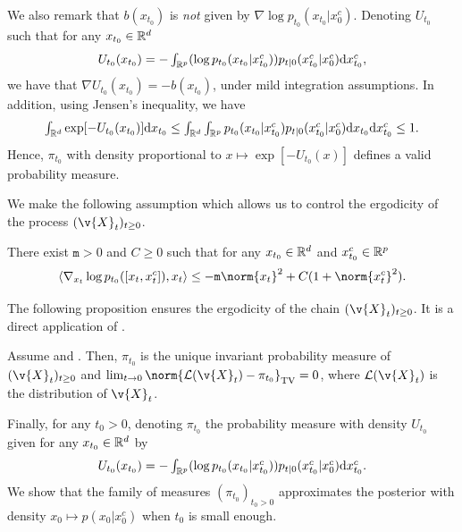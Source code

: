 We also remark that $b(x_{t_0})$ is \emph{not} given by $\nabla \log p_{t_0}(x_{t_0}|x_0^c)$.
Denoting $U_{t_0}$ such that for any $x_{t_0} \in \mathbb{R}^d$ \begin{equation} \textstyle U_{t_0}(x_{t_0}) = -\int_{\mathbb{R}^p} (\log p_{t_0}(x_{t_0} | x_{t_0}^c)) p_{t|0}(x_{t_0}^c|x_0^c) \mathrm{d} x_{t_0}^c , \end{equation} we have that $\nabla U_{t_0}(x_{t_0}) = -b(x_{t_0})$, under mild integration assumptions.
In addition, using Jensen's inequality, we have \begin{align} \textstyle \int_{\mathbb{R}^d} \exp[-U_{t_0}(x_{t_0})] \mathrm{d} x_{t_0} \leq \int_{\mathbb{R}^d} \int_{\mathbb{R}^p} p_{t_0}(x_{t_0}| x_{t_0}^c) p_{t|0}(x_{t_0}^c|x_0^c) \mathrm{d} x_{t_0} \mathrm{d} x_{t_0}^c \leq 1 .
\end{align}
Hence, $\pi_{t_0}$ with density proportional to $x \mapsto \exp[-U_{t_0}(x)]$ defines a valid probability measure.

We make the following assumption which allows us to control the ergodicity of the process $(\v{X}_t)_{t \geq 0}$.

\begin{assumption}
	\label{assum:ergodicity}
	There exist $\mathtt{m} > 0$ and $C \geq 0$ such that for any $x_{t_0} \in \mathbb{R}^d$ and $x_{t_0}^c \in \mathbb{R}^p$ \begin{equation} \langle \nabla_{x_t} \log p_{t_0}([x_t, x_t^c]), x_t \rangle \leq -\mathtt{m} \norm{x_t}^2 + C(1 + \norm{x_t^c}^2) .
	\end{equation}
\end{assumption}

The following proposition ensures the ergodicity of the chain $(\v{X}_t)_{t \geq 0}$.
It is a direct application of \textcite[Theorem 2.1]{roberts1996exponential}.

\begin{proposition}
	Assume \textup{} and \textup{}.
	Then, $\pi_{t_0}$ is the unique invariant probability measure of $(\v{X}_t)_{t \geq 0}$ and $\lim_{t \to 0} \norm{\mathcal{L}(\v{X}_t) - \pi_{t_0}}_{\mathrm{TV}} = 0$, where $\mathcal{L}(\v{X}_t)$ is the distribution of $\v{X}_t$.
\end{proposition}

Finally, for any $t_0 > 0$, denoting $\pi_{t_0}$ the probability measure with density $U_{t_0}$ given for any $x_{t_0} \in \mathbb{R}^d$ by \begin{equation} \textstyle U_{t_0}(x_{t_0}) = -\int_{\mathbb{R}^p} (\log p_{t_0}(x_{t_0} | x_{t_0}^c)) p_{t|0}(x_{t_0}^c|x_0^c) \mathrm{d} x_{t_0}^c .
\end{equation}
We show that the family of measures $(\pi_{t_0})_{t_0 > 0}$ approximates the posterior with density $x_0 \mapsto p(x_0|x_0^c)$ when $t_0$ is small enough.


